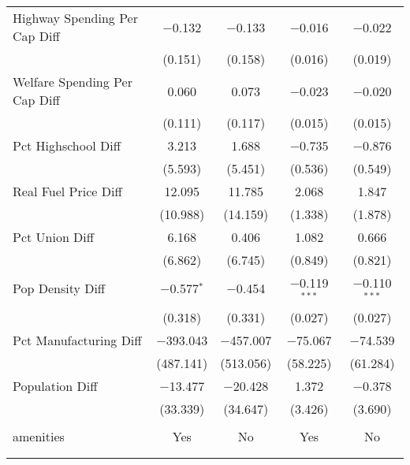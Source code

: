 \begin{table}[!htbp]
\begin{tabular}{@{\extracolsep{5pt}}lcccc}
  Highway Spending Per Cap Diff & $-$0.132 & $-$0.133 & $-$0.016 & $-$0.022 \\ 
  & (0.151) & (0.158) & (0.016) & (0.019) \\ 
  Welfare Spending Per Cap Diff & 0.060 & 0.073 & $-$0.023 & $-$0.020 \\ 
  & (0.111) & (0.117) & (0.015) & (0.015) \\ 
  Pct Highschool Diff & 3.213 & 1.688 & $-$0.735 & $-$0.876 \\ 
  & (5.593) & (5.451) & (0.536) & (0.549) \\ 
  Real Fuel Price Diff & 12.095 & 11.785 & 2.068 & 1.847 \\ 
  & (10.988) & (14.159) & (1.338) & (1.878) \\ 
  Pct Union Diff & 6.168 & 0.406 & 1.082 & 0.666 \\ 
  & (6.862) & (6.745) & (0.849) & (0.821) \\ 
  Pop Density Diff & $-$0.577$^{*}$ & $-$0.454 & $-$0.119$^{***}$ & $-$0.110$^{***}$ \\ 
  & (0.318) & (0.331) & (0.027) & (0.027) \\ 
  Pct Manufacturing Diff & $-$393.043 & $-$457.007 & $-$75.067 & $-$74.539 \\ 
  & (487.141) & (513.056) & (58.225) & (61.284) \\ 
  Population Diff & $-$13.477 & $-$20.428 & 1.372 & $-$0.378 \\ 
  & (33.339) & (34.647) & (3.426) & (3.690) \\ 
 \hline \\[-1.8ex] 
amenities & Yes & No & Yes & No \\ 
\hline \\[-1.8ex] 
\hline 
\hline \\[-1.8ex] 
\end{tabular} 
\end{table} 
